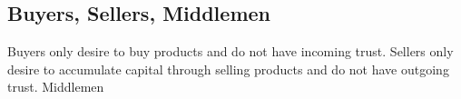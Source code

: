 \subsection{Buyers, Sellers, Middlemen}
  Buyers only desire to buy products and do not have incoming trust. Sellers only desire to accumulate capital through selling
  products and do not have outgoing trust. Middlemen
